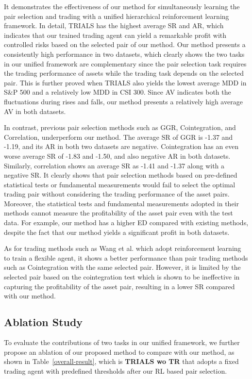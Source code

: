 \documentclass[sigconf]{acmart}
\begin{document}
It demonstrates the effectiveness of our method for simultaneously learning the pair selection and trading with a unified hierarchical reinforcement learning framework.
In detail, TRIALS has the highest average SR and AR, which indicates that our trained trading agent can yield a remarkable profit with controlled risks based on the selected pair of our method.
Our method presents a consistently high performance in two datasets, which clearly shows the two tasks in our unified framework are complementary since the pair selection task requires the trading performance of assets while the trading task depends on the selected pair.
This is further proved when TRIALS also yields the lowest average MDD in S\&P 500 and a relatively low MDD in CSI 300.
Since AV indicates both the fluctuations during rises and falls, our method presents a relatively high average AV in both datasets.

In contrast, previous pair selection methods such as GGR, Cointegration, and Correlation, underperform our method.
The average SR of GGR is -1.37 and -1.19, and its AR in both two datasets are negative.
Cointegration has an even worse average SR of -1.83 and -1.50, and also negative AR in both datasets.
Similarly, correlation shows an average SR as -1.41 and -1.37 along with a negative SR.
It clearly shows that pair selection methods based on pre-defined statistical tests or fundamental measurements would fail to select the optimal trading pair
without considering the trading performance of the asset pairs.
Moreover, the statistical tests and fundamental measurements adopted in their methods cannot measure the profitability of the asset pair even with the test data.
For example, our method has a higher ED compared with existing methods, despite the fact that our method yields a significant profit in both datasets.

As for trading methods such as Wang et al. which adopt reinforcement learning to train a flexible agent, it shows a better performance than pair trading methods such as Cointegration with the same selected pair.
However, it is limited by the selected pair based on the cointegration test which is shown to be ineffective in capturing the profitability of the asset pair, resulting in a lower SR compared with our method.
	
\subsection{Ablation Study}
To evaluate the contributions of two tasks in our unified framework, we further propose an ablation of our proposed method to compare with our method, as shown in Table~\ref{overall-result}, which is \textbf{TRIALS wo TR} that adopts a fixed trading agent with predefined thresholds after our RL based pair selection.
\end{document}
